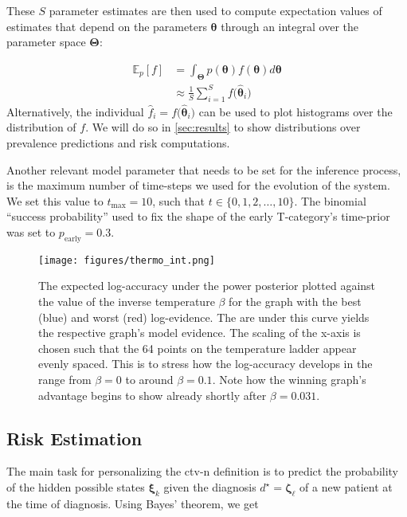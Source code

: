 \documentclass[twocolumn]{article}
\begin{document}
These $S$ parameter estimates are then used to compute expectation values of estimates that depend on the parameters $\boldsymbol{\theta}$ through an integral over the parameter space $\boldsymbol{\Theta}$:

\begin{equation}
    \begin{aligned}
        \mathbb{E}_p \left[ f \right] &= \int_{\boldsymbol{\Theta}} p(\boldsymbol{\theta}) f(\boldsymbol{\theta}) d\boldsymbol{\theta} \\
        &\approx \frac{1}{S} \sum_{i=1}^S f \big( \boldsymbol{\hat{\theta}}_i \big)
    \end{aligned}
\end{equation}
%
Alternatively, the individual $\hat{f}_i = f\big( \boldsymbol{\hat{\theta}}_i \big)$ can be used to plot histograms over the distribution of $f$. We will do so in \cref{sec:results} to show distributions over prevalence predictions and risk computations.

Another relevant model parameter that needs to be set for the inference process, is the maximum number of time-steps we used for the evolution of the system. We set this value to $t_\text{max} = 10$, such that $t \in \{ 0, 1, 2, \ldots, 10 \}$. The binomial ``success probability'' used to fix the shape of the early T-category's time-prior was set to $p_\text{early} = 0.3$.

\begin{figure}[t]
    \centering
    \texttt{[image: figures/thermo\_int.png]}
    \caption{The expected log-accuracy under the power posterior plotted against the value of the inverse temperature $\beta$ for the graph with the best (blue) and worst (red) log-evidence. The are under this curve yields the respective graph's model evidence. The scaling of the x-axis is chosen such that the 64 points on the temperature ladder appear evenly spaced. This is to stress how the log-accuracy develops in the range from $\beta=0$ to around $\beta=0.1$. Note how the winning graph's advantage begins to show already shortly after $\beta=0.031$.
    \label{fig:thermo_int}}
\end{figure}


\subsection{Risk Estimation}
\label{subsec:formalism:risk}

The main task for personalizing the \gls{ctv-n} definition is to predict the probability of the hidden possible states $\boldsymbol{\xi}_k$ given the diagnosis $d^\star=\boldsymbol{\zeta}_\ell$ of a new patient at the time of diagnosis. Using Bayes' theorem, we get
\end{document}
